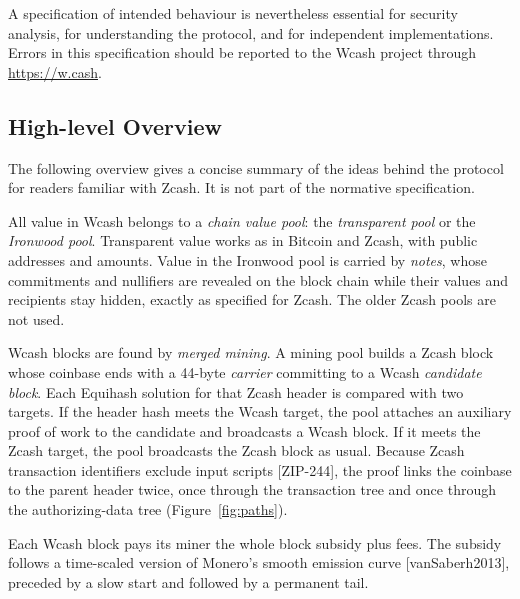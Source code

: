 \documentclass[10pt,letterpaper]{article}
\newcommand\term[1]{\textsl{#1}}
\theoremstyle{plain}
\begin{document}
A specification of intended behaviour is nevertheless essential for security analysis, for understanding the protocol, and for independent implementations. Errors in this specification should be reported to the Wcash project through \url{https://w.cash}.

\subsection{High-level Overview}\label{sec:overview}

The following overview gives a concise summary of the ideas behind the protocol for readers familiar with Zcash. It is not part of the normative specification.

All value in Wcash belongs to a \term{chain value pool}: the \term{transparent pool} or the \term{Ironwood pool}. Transparent value works as in Bitcoin and Zcash, with public addresses and amounts. Value in the Ironwood pool is carried by \term{notes}, whose commitments and nullifiers are revealed on the block chain while their values and recipients stay hidden, exactly as specified for Zcash. The older Zcash pools are not used.

Wcash blocks are found by \term{merged mining}. A mining pool builds a Zcash block whose coinbase ends with a 44-byte \term{carrier} committing to a Wcash \term{candidate block}. Each Equihash solution for that Zcash header is compared with two targets. If the header hash meets the Wcash target, the pool attaches an auxiliary proof of work to the candidate and broadcasts a Wcash block. If it meets the Zcash target, the pool broadcasts the Zcash block as usual. Because Zcash transaction identifiers exclude input scripts [ZIP-244], the proof links the coinbase to the parent header twice, once through the transaction tree and once through the authorizing-data tree (Figure~\ref{fig:paths}).

Each Wcash block pays its miner the whole block subsidy plus fees. The subsidy follows a time-scaled version of Monero's smooth emission curve [vanSaberh2013], preceded by a slow start and followed by a permanent tail.
\end{document}
